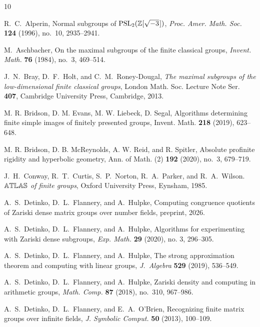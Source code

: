 \documentclass[11pt]{amsart}
\theoremstyle{definition}
\theoremstyle{remark}
\newcommand{\Z}{\mathbb{Z}}
\begin{document}

\begin{thebibliography}{10}

R.~C.~Alperin, Normal subgroups of 
$\mathrm{PSL}_2(\Z[\sqrt{-3}\hspace{.75pt}])$, 
\emph{Proc. Amer. Math. Soc.} \textbf{124} (1996), no.~10, 2935--2941. 

M.~Aschbacher,
 On the maximal subgroups of the finite classical groups,
 {\em Invent. Math.} {\bf 76} (1984), no.~3, 469--514.

J.~N.~Bray, D.~F.~Holt, and C.~M.~Roney-Dougal, 
\emph{The maximal subgroups of the low-dimensional finite classical 
groups}, London Math. Soc. Lecture Note Ser. \textbf{407}, 
Cambridge University Press, Cambridge, 2013.

M. R. Bridson, D. M. Evans, M. W. Liebeck, D. Segal,
Algorithms determining finite simple images of finitely presented groups,
 Invent. Math. \textbf{218} (2019), 623--648. 

M. R. Bridson, D. B. McReynolds, A. W. Reid, and R. Spitler,
Absolute profinite rigidity and hyperbolic geometry, Ann. of Math. (2) 
\textbf{192} (2020), no.~3, 679--719.

J.~H.~Conway, R.~T.~Curtis, S.~P.~Norton, R.~A.~Parker, and
 R.~A.~Wilson. {\em {$\Bbb{ATLAS}$} of finite groups},
 Oxford University Press, Eynsham, 1985.

A.~S.~Detinko, D.~L.~Flannery, and A.~Hulpke, Computing congruence
quotients of Zariski dense matrix groups over number fields, preprint, 2026.

A.~S.~Detinko, D.~L.~Flannery, and A.~Hulpke, 
Algorithms for experimenting with Zariski dense subgroups, 
\emph{Exp. Math.} \textbf{29} (2020), no. 3, 296--305.

A.~S.~Detinko, D.~L.~Flannery, and A.~Hulpke, 
 The strong approximation theorem and computing with 
linear groups,  \emph{J.~Algebra} \textbf{529} (2019), 536--549.

A.~S.~Detinko, D.~L.~Flannery, and A.~Hulpke, Zariski density and
 computing in arithmetic groups, \emph{Math. Comp.} \textbf{87} 
(2018), no.~310, 967--986. 

A.~S.~Detinko, D.~L.~Flannery, and E.~A.~O'Brien, 
 Recognizing finite matrix groups  over infinite fields, 
\emph{J. Symbolic Comput.} \textbf{50} (2013), 100--109.


\end{thebibliography}
\end{document}
